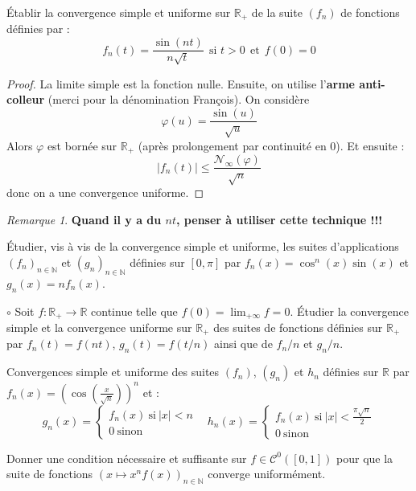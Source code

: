 \documentclass[french,a4paper]{article}
\newcommand{\N}{\mathbb{N}}
\newcommand{\R}{\mathbb{R}}
\theoremstyle{plain}
\theoremstyle{definition}
\theoremstyle{remark}
\newtheorem*{rmq}{Remarque}
\begin{document}
\begin{ex}{}
	Établir la convergence simple et uniforme sur $\R_+$ de la suite $(f_n)$ de fonctions définies par : $$f_n(t)=\frac{\sin(nt)}{n\sqrt{t}}\ \ \text{si }t>0 \ \ \text{et} \ \ f(0)=0$$
\end{ex}
\begin{proof}
	La limite simple est la fonction nulle. Ensuite, on utilise l'\textbf{arme anti-colleur} (merci pour la dénomination François). On considère $$\varphi(u)=\frac{\sin(u)}{\sqrt{u}}$$ Alors $\varphi$ est bornée sur $\R_+$ (après prolongement par continuité en $0$). Et ensuite : $$\lvert f_n(t)\rvert\leqslant \frac{\mathcal{N}_\infty(\varphi)}{\sqrt{n}}$$ donc on a une convergence uniforme.
\end{proof}
\begin{rmq}
	\textbf{Quand il y a du $nt$, penser à utiliser cette technique !!!}
\end{rmq}

\begin{ex}{}
	Étudier, vis à vis de la convergence simple et uniforme, les suites d'applications $(f_n)_{n\in\N}$ et $(g_n)_{n\in\N}$ définies sur $[0,\pi]$ par $f_n(x)=\cos^n(x)\sin(x)$ et $g_n(x)=nf_n(x)$.
\end{ex}

\begin{ex}{$\circ$}
	Soit $f:\R_+\to\R$ continue telle que $f(0)=\lim_{+\infty} f=0$. Étudier la convergence simple et la convergence uniforme sur $\R_+$ des suites de fonctions définies sur $\R_+$ par $f_n(t)=f(nt)$, $g_n(t)=f(t/n)$ ainsi que de $f_n/n$ et $g_n/n$.
\end{ex}

\begin{ex}{}
	Convergences simple et uniforme des suites $(f_n)$, $(g_n)$ et $h_n$ définies sur $\R$ par $f_n(x)=\displaystyle\left(\cos\left(\frac{x}{\sqrt{n}}\right)\right)^n$ et : $$g_n(x)=\begin{cases}
		f_n(x)\ \text{si}\ \lvert x\rvert <n \\
		0\ \text{sinon}
	\end{cases}\ \ \ \ h_n(x)=\begin{cases}
	f_n(x)\ \text{si}\ \lvert x\rvert<\frac{\pi\sqrt{n}}{2}\\
	0\ \text{sinon}
	\end{cases}$$
\end{ex}

\begin{ex}{}
	Donner une condition nécessaire et suffisante sur $f\in\mathcal{C}^0([0,1])$ pour que la suite de fonctions $(x\mapsto x^nf(x))_{n\in\N}$ converge uniformément.
\end{ex}
\end{document}
